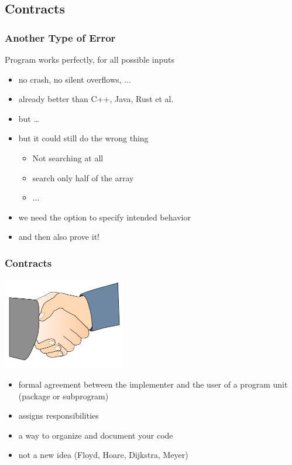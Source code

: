 \subsection{Contracts}
\begin{frame}\frametitle{Another Type of Error}
  Program works perfectly, for all possible inputs
  \begin{itemize}
  \item no crash, no silent overflows, ...
  \item already better than C++, Java, Rust et al.
  \item<1-1> but \dots
  \item<2-> \vspace{-1.36em}but it could still do the wrong thing
    \begin{itemize}
    \item Not searching at all
    \item search only half of the array
    \item ...
    \end{itemize}
  \item<2-> we need the option to specify intended behavior
  \item<2-> and then also prove it!
  \end{itemize}
\end{frame}
\addtocounter{clock}{2}

\begin{frame}
  \frametitle{Contracts}
  \begin{center}
    \includegraphics[height=4cm]{content/images/spark/contracts}
  \end{center}

    \begin{itemize}
    \item formal agreement between the implementer and the user of a
      program unit (package or subprogram)
    \item assigns responsibilities
    \item a way to organize and document your code
    \item not a new idea (Floyd, Hoare, Dijkstra, Meyer)
    \end{itemize}
\end{frame}
\addtocounter{clock}{2}

